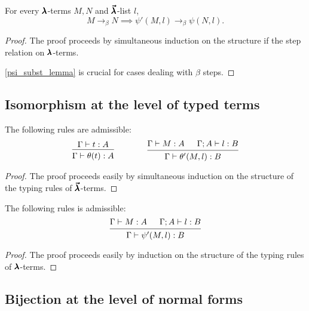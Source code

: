 \begin{theorem}
  \label{theorem10}
  For every $\pmb{\lambda}$-terms $M, N$ and $\pmb{\vec \lambda}$-list $l$,
  \[ M \to_{\beta} N \implies \psi'(M, l) \to_{\beta} \psi(N, l). \]
\end{theorem}
\begin{proof}
  The proof proceeds by simultaneous induction on the structure if the step relation on $\pmb{\lambda}$-terms.

  \cref{psi_subst_lemma} is crucial for cases dealing with $\beta$ steps.
\end{proof}

\subsection{Isomorphism at the level of typed terms}

\begin{theorem}
  \label{theorem11}
  The following rules are admissible:
  \[ \begin{prooftree}
      \hypo{ \Gamma \vdash t : A }
      \infer1{ \Gamma \vdash \theta(t) : A } 
    \end{prooftree}
    \qquad \qquad
    \begin{prooftree}
      \hypo{ \Gamma \vdash M : A }
      \hypo{ \Gamma ; A \vdash l : B }
      \infer2{ \Gamma \vdash \theta'(M, l) : B }.
    \end{prooftree} \]
\end{theorem}
\begin{proof}
  The proof proceeds easily by simultaneous induction on the structure of the typing rules of $\pmb{\vec \lambda}$-terms.
\end{proof}

\begin{theorem}
  \label{theorem12}
  The following rules is admissible:
  \[ \begin{prooftree}
      \hypo{ \Gamma \vdash M : A }
      \hypo{ \Gamma ; A \vdash l : B }
      \infer2{ \Gamma \vdash \psi'(M, l) : B }.
    \end{prooftree} \]
\end{theorem}
\begin{proof}
  The proof proceeds easily by induction on the structure of the typing rules of $\pmb{\lambda}$-terms.
\end{proof}

\subsection{Bijection at the level of normal forms}

